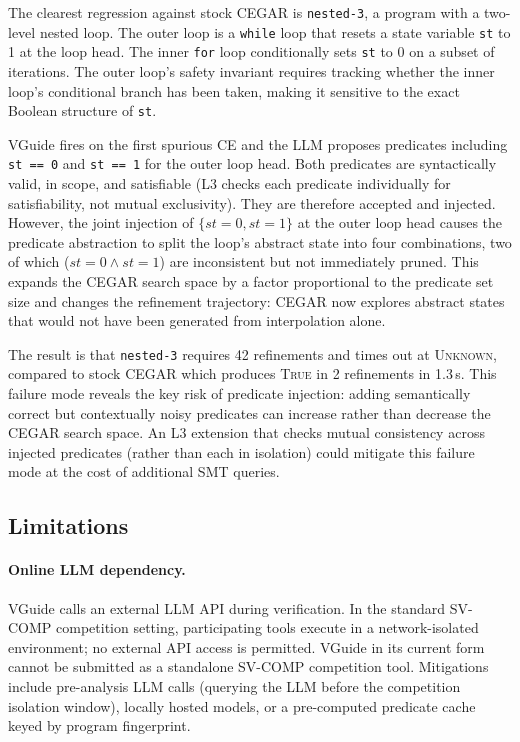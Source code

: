 The clearest regression against stock CEGAR is \texttt{nested-3}, a program with a
two-level nested loop. The outer loop is a \texttt{while} loop that resets a state
variable \texttt{st} to 1 at the loop head. The inner \texttt{for} loop conditionally
sets \texttt{st} to 0 on a subset of iterations. The outer loop's safety invariant
requires tracking whether the inner loop's conditional branch has been taken, making
it sensitive to the exact Boolean structure of \texttt{st}.

VGuide fires on the first spurious CE and the LLM proposes predicates including
\texttt{st == 0} and \texttt{st == 1} for the outer loop head. Both predicates are
syntactically valid, in scope, and satisfiable (L3 checks each predicate individually
for satisfiability, not mutual exclusivity). They are therefore accepted and injected.
However, the joint injection of $\{st = 0, st = 1\}$ at the outer loop head causes
the predicate abstraction to split the loop's abstract state into four combinations,
two of which ($st = 0 \wedge st = 1$) are inconsistent but not immediately pruned.
This expands the CEGAR search space by a factor proportional to the predicate set size
and changes the refinement trajectory: CEGAR now explores abstract states that would
not have been generated from interpolation alone.

The result is that \texttt{nested-3} requires 42 refinements and times out at
\textsc{Unknown}, compared to stock CEGAR which produces \textsc{True} in 2 refinements
in 1.3\,s. This failure mode reveals the key risk of predicate injection: adding
semantically correct but contextually noisy predicates can increase rather than
decrease the CEGAR search space. An L3 extension that checks mutual consistency across
injected predicates (rather than each in isolation) could mitigate this failure mode
at the cost of additional SMT queries.

\subsection{Limitations}

\paragraph{Online LLM dependency.} VGuide calls an external LLM API during
verification. In the standard SV-COMP competition setting, participating tools execute
in a network-isolated environment; no external API access is permitted. VGuide in its
current form cannot be submitted as a standalone SV-COMP competition tool. Mitigations
include pre-analysis LLM calls (querying the LLM before the competition isolation
window), locally hosted models, or a pre-computed predicate cache keyed by program
fingerprint.

